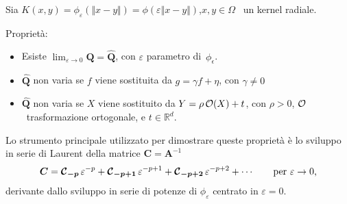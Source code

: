 \documentclass[10pt]{beamer}
\theoremstyle{definition}
\theoremstyle{plain}
\def\R{\mathbb R}
\def\Cal#1{{\cal #1}}
\def\norm#1{\Vert #1\Vert}
\begin{document}
\begin{frame}
Sia $K(x,y) = \phi_\varepsilon(\norm{x-y}) = \phi(\varepsilon\norm{x-y})$,\quad$x,y\in \Omega$
\  un kernel radiale.

\medskip

\alert{Proprietà}:
\begin{itemize}
\item Esiste $\lim_{\varepsilon\to 0} \bm Q = \widehat{\bm Q}$, con $\varepsilon$ parametro di~$\phi_\epsilon$.
\item $\widehat{\bm Q}$ non varia se $f$ viene sostituita da $g = \gamma f + \eta$, con $\gamma\neq 0$
\item $\widehat{\bm Q}$ non varia se $X$ viene sostituito da $Y = \rho\, \Cal O(X) + t$, con $\rho>0$,  $\Cal O$~trasformazione ortogonale, e $t\in\R^d$.
\end{itemize}

Lo strumento principale utilizzato per dimostrare queste proprietà è lo sviluppo in serie di Laurent della matrice $\bm C = \bm A^{-1}$
$$
\bm C = \bm{\Cal C}_{\bm{-p}}\,\varepsilon^{-p} + \bm{\Cal C}_{\bm{-p+1}}\,\varepsilon^{-p+1} +  \bm{\Cal C}_{\bm{-p+2}}\,\varepsilon^{-p+2}+\cdots\qquad \text{per $\varepsilon\to0$,}
$$
derivante dallo sviluppo in serie di potenze di $\phi_\varepsilon$ centrato in $\varepsilon = 0$.

\end{frame}
\end{document}
